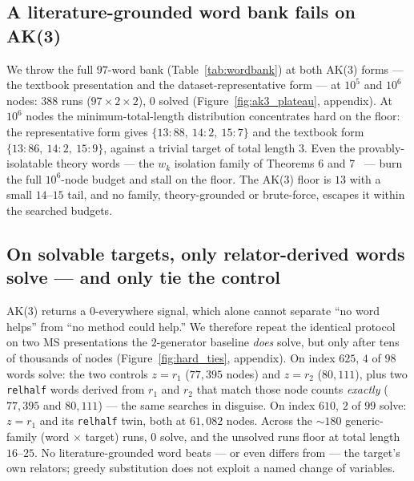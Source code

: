 \begin{table}[tbp]
\centering
\caption{Naive $z=w$ stabilization over the $640$ known-solvable MS(1190) presentations at
$5\times10^5$ nodes. Every arm's solved set is a strict subset of the baseline's; node and
path-length statistics are computed over solved presentations only.}
\label{tab:arms}
\small
\setlength{\tabcolsep}{3pt}%

\end{table}

\subsection{A literature-grounded word bank fails on AK(3)}

We throw the full $97$-word bank (Table~\ref{tab:wordbank}) at both AK(3) forms --- the
textbook presentation and the dataset-representative form --- at $10^5$ and $10^6$ nodes:
$388$ runs ($97\times2\times2$), $0$ solved (Figure~\ref{fig:ak3_plateau}, appendix). At
$10^6$ nodes the minimum-total-length distribution concentrates hard on the floor: the
representative form gives $\{13\!:\!88,\ 14\!:\!2,\ 15\!:\!7\}$ and the textbook form
$\{13\!:\!86,\ 14\!:\!2,\ 15\!:\!9\}$, against a trivial target of total length $3$. Even
the provably-isolatable theory words --- the $w_k$ isolation family of Theorems 6 and
7~\cite{shehper2024hard} --- burn the full $10^6$-node budget and stall on the floor. The
AK(3) floor is $13$ with a small $14$--$15$ tail, and no family, theory-grounded or
brute-force, escapes it within the searched budgets.

\subsection{On solvable targets, only relator-derived words solve --- and only tie the control}

AK(3) returns a $0$-everywhere signal, which alone cannot separate ``no word helps'' from
``no method could help.'' We therefore repeat the identical protocol on two MS presentations
the $2$-generator baseline \emph{does} solve, but only after tens of thousands of nodes
(Figure~\ref{fig:hard_ties}, appendix). On index $625$, $4$ of $98$ words solve: the two
controls $z=r_1$ ($77{,}395$ nodes) and $z=r_2$ ($80{,}111$), plus two \texttt{relhalf}
words derived from $r_1$ and $r_2$ that match those node counts \emph{exactly} ($77{,}395$
and $80{,}111$) --- the same searches in disguise. On index $610$, $2$ of $99$ solve: $z=r_1$
and its \texttt{relhalf} twin, both at $61{,}082$ nodes. Across the ${\sim}180$
generic-family (word $\times$ target) runs, $0$ solve, and the unsolved runs floor at total
length $16$--$25$. No literature-grounded word beats --- or even differs from --- the target's
own relators; greedy substitution does not exploit a named change of variables.

